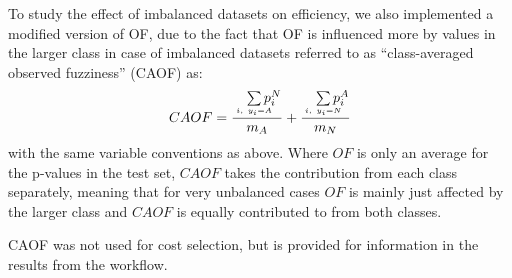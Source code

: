 \documentclass[utf8]{frontiersSCNS} %
\begin{document}
To study the effect of imbalanced datasets on efficiency, we also implemented a
modified version of OF, due to the fact that OF is influenced more
by values in the larger class in case of imbalanced datasets referred to as
``class-averaged
observed fuzziness'' (CAOF) as:
\begin{equation}
CAOF = \frac
        {\quad\sum\limits_{\mathclap{\substack{\scriptscriptstyle i,\ y_i=A}}}p_i^N}
        {m_A}
       + \frac
        {\quad\sum\limits_{\mathclap{\substack{\scriptscriptstyle i,\ y_i=N}}}p_i^A}
        {m_N}
\end{equation}
with the same variable conventions as above. Where $OF$ is only an average for
the p-values in the test set, $CAOF$ takes the contribution from each class
separately, meaning that for very unbalanced cases $OF$ is mainly just affected
by the larger class and $CAOF$ is equally contributed to from both classes.



CAOF was not used for cost selection, but is provided for information in the
results from the workflow.
\end{document}
